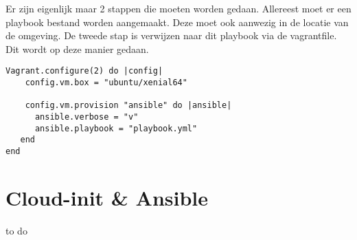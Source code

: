 Er zijn eigenlijk maar 2 stappen die moeten worden gedaan. Allereest moet er een playbook bestand worden aangemaakt. Deze moet ook aanwezig in de locatie van de omgeving. De tweede stap is verwijzen naar dit playbook via de vagrantfile. Dit wordt op deze manier gedaan.
\begin{lstlisting}
Vagrant.configure(2) do |config|
    config.vm.box = "ubuntu/xenial64"
    
    config.vm.provision "ansible" do |ansible|
      ansible.verbose = "v"
      ansible.playbook = "playbook.yml"
   end
end
\end{lstlisting}

\section{Cloud-init \& Ansible }
to do
